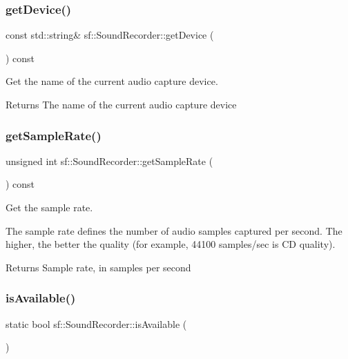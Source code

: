 \subsubsection{\texorpdfstring{get\+Device()}{getDevice()}}
{\footnotesize\ttfamily const std\+::string\& sf\+::\+Sound\+Recorder\+::get\+Device (\begin{DoxyParamCaption}{ }\end{DoxyParamCaption}) const}



Get the name of the current audio capture device. 

\begin{DoxyReturn}{Returns}
The name of the current audio capture device 
\end{DoxyReturn}
\mbox{\label{classsf_1_1_sound_recorder_aed292c297a3e0d627db4eb5c18f58c44}} 
\subsubsection{\texorpdfstring{get\+Sample\+Rate()}{getSampleRate()}}
{\footnotesize\ttfamily unsigned int sf\+::\+Sound\+Recorder\+::get\+Sample\+Rate (\begin{DoxyParamCaption}{ }\end{DoxyParamCaption}) const}



Get the sample rate. 

The sample rate defines the number of audio samples captured per second. The higher, the better the quality (for example, 44100 samples/sec is CD quality).

\begin{DoxyReturn}{Returns}
Sample rate, in samples per second 
\end{DoxyReturn}
\mbox{\label{classsf_1_1_sound_recorder_aab2bd0fee9e48d6cfd449b1cb078ce5a}} 
\subsubsection{\texorpdfstring{is\+Available()}{isAvailable()}}
{\footnotesize\ttfamily static bool sf\+::\+Sound\+Recorder\+::is\+Available (\begin{DoxyParamCaption}{ }\end{DoxyParamCaption})\hspace{0.3cm}{\ttfamily [static]}}



